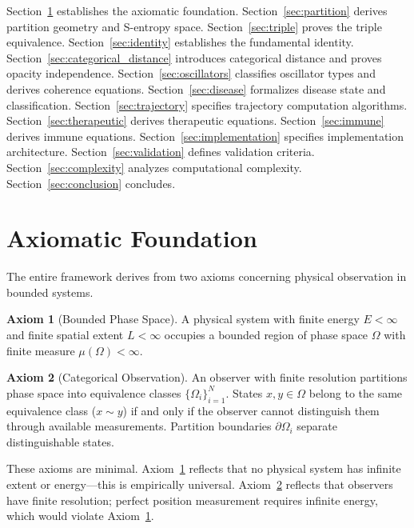 \documentclass[10pt,twocolumn]{article}
\theoremstyle{plain}
\theoremstyle{definition}
\newtheorem{axiom}{Axiom}
\theoremstyle{remark}
\begin{document}
Section~\ref{sec:axioms} establishes the axiomatic foundation. Section~\ref{sec:partition} derives partition geometry and S-entropy space. Section~\ref{sec:triple} proves the triple equivalence. Section~\ref{sec:identity} establishes the fundamental identity. Section~\ref{sec:categorical_distance} introduces categorical distance and proves opacity independence. Section~\ref{sec:oscillators} classifies oscillator types and derives coherence equations. Section~\ref{sec:disease} formalizes disease state and classification. Section~\ref{sec:trajectory} specifies trajectory computation algorithms. Section~\ref{sec:therapeutic} derives therapeutic equations. Section~\ref{sec:immune} derives immune equations. Section~\ref{sec:implementation} specifies implementation architecture. Section~\ref{sec:validation} defines validation criteria. Section~\ref{sec:complexity} analyzes computational complexity. Section~\ref{sec:conclusion} concludes.

\section{Axiomatic Foundation}
\label{sec:axioms}

The entire framework derives from two axioms concerning physical observation in bounded systems.

\begin{axiom}[Bounded Phase Space]
\label{ax:bounded}
A physical system with finite energy $E < \infty$ and finite spatial extent $L < \infty$ occupies a bounded region of phase space $\Omega$ with finite measure $\mu(\Omega) < \infty$.
\end{axiom}

\begin{axiom}[Categorical Observation]
\label{ax:categorical}
An observer with finite resolution partitions phase space into equivalence classes $\{\Omega_i\}_{i=1}^N$. States $x, y \in \Omega$ belong to the same equivalence class ($x \sim y$) if and only if the observer cannot distinguish them through available measurements. Partition boundaries $\partial \Omega_i$ separate distinguishable states.
\end{axiom}

These axioms are minimal. Axiom~\ref{ax:bounded} reflects that no physical system has infinite extent or energy---this is empirically universal. Axiom~\ref{ax:categorical} reflects that observers have finite resolution; perfect position measurement requires infinite energy, which would violate Axiom~\ref{ax:bounded}.
\end{document}
